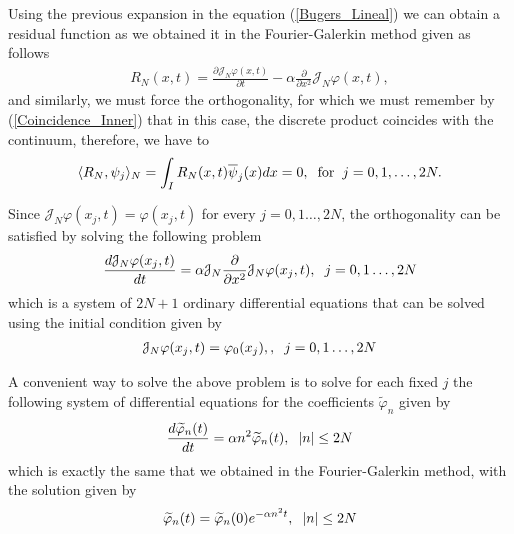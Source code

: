 	Using the previous expansion in the equation (\ref{Bugers_Lineal}) we can obtain a residual function as we obtained it in the Fourier-Galerkin method given as follows
	\begin{align*}
		R_N (x, t) = \frac{\partial \mathcal{J}_N \varphi (x, t)}{\partial t} - \alpha \frac{\partial}{\partial x^2} \mathcal{J}_N \varphi (x, t),
	\end{align*}	
	and similarly, we must force the orthogonality, for which we must remember by (\ref{Coincidence_Inner}) that in this case, the discrete product coincides with the continuum, therefore, we have to
	\begin{align*}
		\langle R_N, \psi_j \rangle_N = \int_{I} R_N (x, t) \overline{\psi}_j (x) dx = 0, \hspace{2mm} \text{for} \hspace{2mm} j = 0, 1, \dots, 2N.
	\end{align*} 
	
	Since $\mathcal{J}_N \varphi (x_j, t) = \varphi (x_j, t)$ for every $j= 0, 1 \dots, 2N$, the orthogonality can be satisfied by solving the following problem
	\begin{align}
	\label{Collocation_Linear}	
		\frac{d \mathcal{J}_N \varphi (x_j, t)}{dt} = \alpha \mathcal{J}_N \frac{\partial}{\partial x^2} \mathcal{J}_N \varphi (x_j, t), \hspace{2mm} j = 0, 1 \dots, 2N
	\end{align}
	which is a system of $2N + 1$ ordinary differential equations that can be solved using the initial condition given by
	\begin{align*}
		\mathcal{J}_N \varphi (x_j, t) =  \varphi_0 (x_j), , \hspace{2mm} j = 0, 1 \dots, 2N
	\end{align*}
	
	A convenient way to solve the above problem is to solve for each fixed $ j $ the following system of differential equations for the coefficients $ \widetilde{\varphi}_n$ given by
	\begin{align*}
		\frac{d \widetilde{\varphi}_n (t)}{dt} =  \alpha n^2 \widetilde{\varphi}_n (t), \hspace{2mm} |n| \leq 2N
	\end{align*}
	which is exactly the same that we obtained in the Fourier-Galerkin method, with the solution given by
	\begin{align*}
		\widetilde{\varphi}_n (t) = \widetilde{\varphi}_n (0) e^{- \alpha n^2 t}, \hspace{2mm} |n| \leq 2N
	\end{align*}

